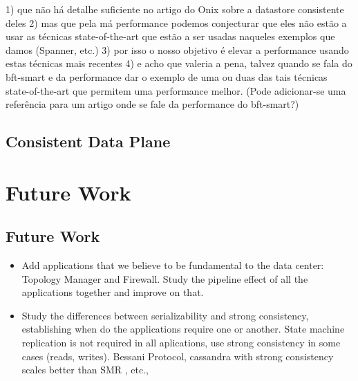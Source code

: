 1) que não há detalhe suficiente no artigo do Onix sobre a datastore
consistente deles
2) mas que pela má performance podemos conjecturar que eles não estão a usar
as técnicas state-of-the-art que estão a ser usadas naqueles exemplos que
damos (Spanner, etc.)
3) por isso o nosso objetivo é elevar a performance usando estas técnicas
mais recentes
4) e acho que valeria a pena, talvez quando se fala do bft-smart e da
performance dar o exemplo de uma ou duas das tais técnicas state-of-the-art
que permitem uma performance melhor. (Pode adicionar-se uma referência para
um artigo onde se fale da performance do bft-smart?)


\subsection{Consistent Data Plane}

\section{Future Work}


\subsection{Future Work}
\begin{itemize}
\item Add applications that we believe to be fundamental to the data center: Topology Manager and Firewall.  Study the pipeline effect of all the applications together and improve on that. 
\item Study the differences between serializability and strong consistency, establishing when do the applications require one or another. State machine replication is not required in all aplications, use strong consistency in some cases (reads, writes). Bessani Protocol, cassandra with strong consistency scales better than SMR , etc., 
\end{itemize}



